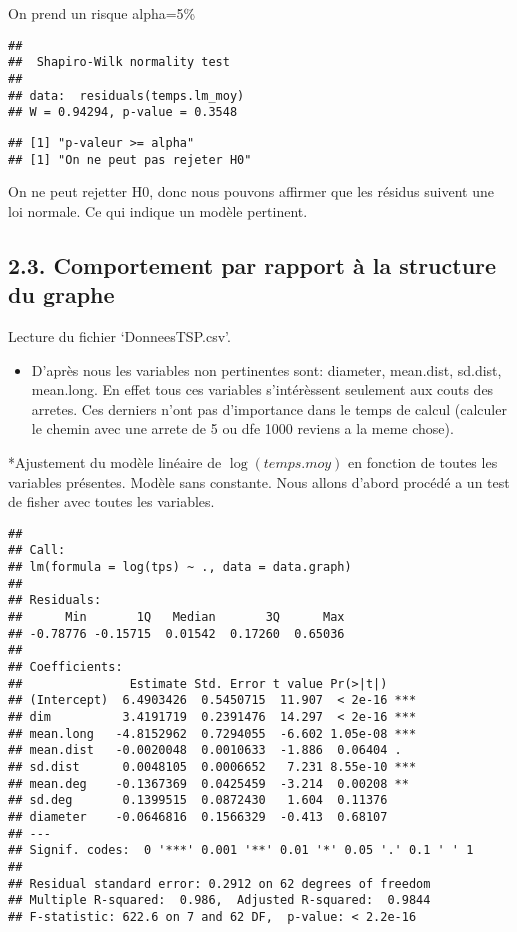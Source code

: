 \documentclass[
]{article}
\providecommand{\tightlist}{%
  \setlength{\itemsep}{0pt}\setlength{\parskip}{0pt}}
\begin{document}
On prend un risque alpha=5\%

\begin{verbatim}
## 
##  Shapiro-Wilk normality test
## 
## data:  residuals(temps.lm_moy)
## W = 0.94294, p-value = 0.3548
\end{verbatim}

\begin{verbatim}
## [1] "p-valeur >= alpha"
## [1] "On ne peut pas rejeter H0"
\end{verbatim}

On ne peut rejetter H0, donc nous pouvons affirmer que les résidus
suivent une loi normale. Ce qui indique un modèle pertinent.

\hypertarget{comportement-par-rapport-uxe0-la-structure-du-graphe}{%
\subsection{2.3. Comportement par rapport à la structure du
graphe}\label{comportement-par-rapport-uxe0-la-structure-du-graphe}}

Lecture du fichier `DonneesTSP.csv'.

\begin{itemize}
\tightlist
\item
  D'après nous les variables non pertinentes sont: diameter, mean.dist,
  sd.dist, mean.long. En effet tous ces variables s'intérèssent
  seulement aux couts des arretes. Ces derniers n'ont pas d'importance
  dans le temps de calcul (calculer le chemin avec une arrete de 5 ou
  dfe 1000 reviens a la meme chose).
\end{itemize}

*Ajustement du modèle linéaire de \(\log(temps.moy)\) en fonction de
toutes les variables présentes. Modèle sans constante. Nous allons
d'abord procédé a un test de fisher avec toutes les variables.

\begin{verbatim}
## 
## Call:
## lm(formula = log(tps) ~ ., data = data.graph)
## 
## Residuals:
##      Min       1Q   Median       3Q      Max 
## -0.78776 -0.15715  0.01542  0.17260  0.65036 
## 
## Coefficients:
##               Estimate Std. Error t value Pr(>|t|)    
## (Intercept)  6.4903426  0.5450715  11.907  < 2e-16 ***
## dim          3.4191719  0.2391476  14.297  < 2e-16 ***
## mean.long   -4.8152962  0.7294055  -6.602 1.05e-08 ***
## mean.dist   -0.0020048  0.0010633  -1.886  0.06404 .  
## sd.dist      0.0048105  0.0006652   7.231 8.55e-10 ***
## mean.deg    -0.1367369  0.0425459  -3.214  0.00208 ** 
## sd.deg       0.1399515  0.0872430   1.604  0.11376    
## diameter    -0.0646816  0.1566329  -0.413  0.68107    
## ---
## Signif. codes:  0 '***' 0.001 '**' 0.01 '*' 0.05 '.' 0.1 ' ' 1
## 
## Residual standard error: 0.2912 on 62 degrees of freedom
## Multiple R-squared:  0.986,  Adjusted R-squared:  0.9844 
## F-statistic: 622.6 on 7 and 62 DF,  p-value: < 2.2e-16
\end{verbatim}
\end{document}
